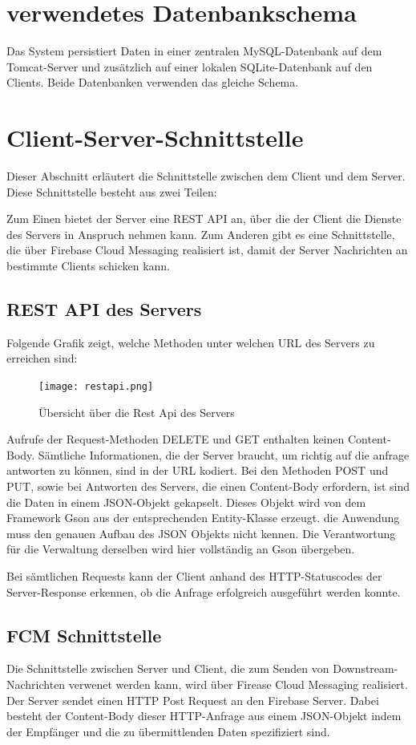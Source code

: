 


\section{verwendetes Datenbankschema}
Das System persistiert Daten in einer zentralen MySQL-Datenbank auf dem Tomcat-Server und zusätzlich auf einer lokalen SQLite-Datenbank auf den Clients. Beide Datenbanken verwenden das gleiche Schema.\\

\section{Client-Server-Schnittstelle}
Dieser Abschnitt erläutert die Schnittstelle zwischen dem Client und dem Server. Diese Schnittstelle besteht aus zwei Teilen:

Zum Einen bietet der Server eine REST API an, über die der Client die Dienste des Servers in Anspruch nehmen kann. Zum Anderen gibt es eine Schnittstelle, die über Firebase Cloud Messaging realisiert ist, damit der Server Nachrichten an bestimmte Clients schicken kann.

\subsection{REST API des Servers}
Folgende Grafik zeigt, welche Methoden unter welchen URL des Servers zu erreichen sind:
\begin{figure}[H]
	\centering
	\texttt{[image: restapi.png]}
	\caption{Übersicht über die Rest Api des Servers}
\end{figure}
Aufrufe der Request-Methoden DELETE und GET enthalten keinen Content-Body. Sämtliche Informationen, die der Server braucht, um richtig auf die anfrage antworten zu können, sind in der URL kodiert.
Bei den Methoden POST und PUT, sowie bei Antworten des Servers, die einen Content-Body erfordern, ist sind die Daten in einem JSON-Objekt gekapselt. Dieses Objekt wird von dem Framework Gson aus der entsprechenden Entity-Klasse erzeugt. die Anwendung muss den genauen Aufbau des JSON Objekts nicht kennen. Die Verantwortung für die Verwaltung derselben wird hier vollständig an Gson übergeben.

Bei sämtlichen Requests kann der Client anhand des HTTP-Statuscodes der Server-Response erkennen, ob die Anfrage erfolgreich ausgeführt werden konnte.

\subsection{FCM Schnittstelle}
Die Schnittstelle zwischen Server und Client, die zum Senden von Downstream-Nachrichten verwenet werden kann, wird über Firease Cloud Messaging realisiert. Der Server sendet einen HTTP Post Request an den Firebase Server. Dabei besteht der Content-Body dieser HTTP-Anfrage aus einem JSON-Objekt indem der Empfänger und die zu übermittlenden Daten spezifiziert sind.

